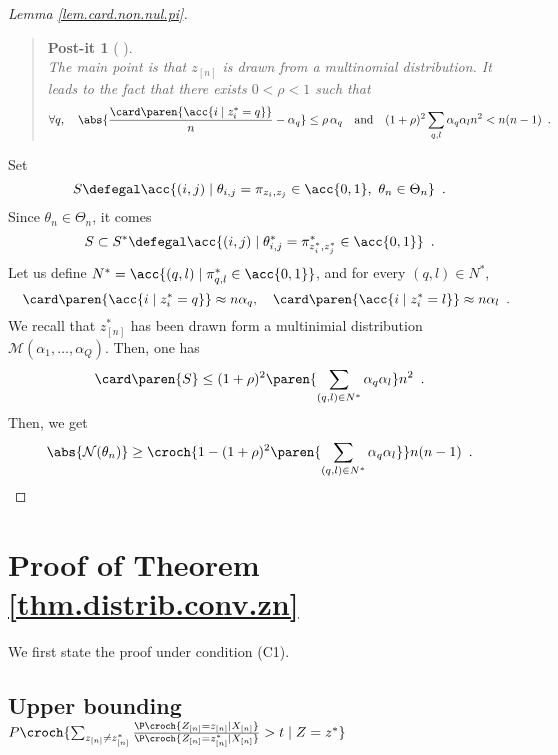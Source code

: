 \documentclass[11pt]{article}
\newtheorem{proof}{Proof}%
\newcommand{\Xn}{X_{[n]}}
\newcommand{\Zn}{Z_{[n]}}
\newcommand{\zn}{z_{[n]}}
\newtheorem{postita}{Post-it}
\newenvironment{postit}[1][]{\begin{quote} \begin{postita}[ #1]}{\end{postita} \end{quote}}
\begin{document}
\begin{proof}[Lemma \ref{lem.card.non.nul.pi}]
~\\
\begin{postit}
~\\
                The main point is that $\zn$ is drawn from a multinomial distribution. It leads to the fact that there exists $0<\rho<1$ such that
\begin{align*}
        \forall q,\quad \abs{\frac{\card\paren{\acc{i\mid z_i^*=q}}}{n}-\alpha_q} \leq \rho\, \alpha_q \quad \mathrm{and} \quad (1+\rho)^2 \sum_{q,l}\alpha_q\alpha_l n^2< n(n-1) \enspace.
\end{align*}
\end{postit}
Set
$$ S\defegal \acc{(i,j)\mid \theta_{i,j}=\pi_{z_i,z_j}\in\acc{0,1},\ \theta_n\in\Theta_n}\enspace.
$$
Since $\theta_n\in\Theta_n$, it comes
$$S\subset S^*\defegal \acc{(i,j)\mid \theta^*_{i,j}=\pi_{z^*_i,z^*_j}^*\in\acc{0,1}}\enspace. $$
Let us define $N^*=\acc{(q,l)\mid \pi_{q,l}^*\in\acc{0,1}}$, and for every $(q,l)\in N^*$,
$$\quad\card\paren{\acc{i\mid z_i^*=q}}\approx n\alpha_q,\quad \card\paren{\acc{i\mid z_i^*=l}}\approx n\alpha_l\enspace.$$
We recall that $\zn^*$ has been drawn form a multinimial distribution $\mathcal{M}(\alpha_1,\ldots,\alpha_Q)$. Then, one has
$$\card\paren{S}\leq (1+\rho)^2\paren{\sum_{(q,l)\in N^*}\alpha_q \alpha_l} n^2\enspace.$$
Then, we get
\begin{align*}
        \abs{\mathcal{N}(\theta_n)}\geq \croch{1-(1+\rho)^2\paren{\sum_{(q,l)\in N^*}\alpha_q \alpha_l}} n(n-1)\enspace.         
\end{align*}

\end{proof}




\section{Proof of Theorem \ref{thm.distrib.conv.zn}}
We first state the proof under condition (C1).

\subsection{Upper bounding $P \croch{ \sum_{\zn \neq
\zn^*}\frac{\P\croch{\Zn=\zn\mid \Xn}}{\P\croch{\Zn=\zn^*\mid \Xn}} > t  \mid  Z=z^*}$}\ \\
\end{document}
